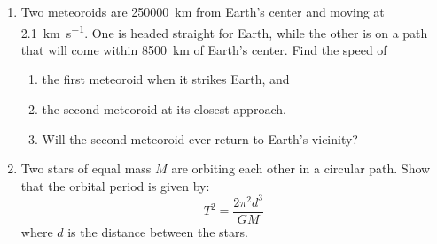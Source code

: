 \documentclass{../../oss-apphys}
\begin{document}
\begin{enumerate}[leftmargin=15pt]
\item Two meteoroids are \SI{250000}{\kilo\metre} from Earth's center and moving
  at \SI{2.1}{\kilo\metre\per\second}. One is headed straight for Earth, while
  the other is on a path that will come within \SI{8500}{\kilo\metre} of Earth's
  center. Find the speed of
  \begin{enumerate}[noitemsep,leftmargin=20pt]
  \item the first meteoroid when it strikes Earth, and
  \item the second meteoroid at its closest approach.
  \item Will the second meteoroid ever return to Earth's vicinity?
  \end{enumerate}
  \vspace{2.5in}

\item Two stars of equal mass $M$ are orbiting each other in a circular path.
  Show that the orbital period is given by:
  \begin{displaymath}
    T^2=\frac{2\pi^2d^3}{GM}
  \end{displaymath}
  where $d$ is the distance between the stars.
  \newpage
  

\end{enumerate}
\end{document}
